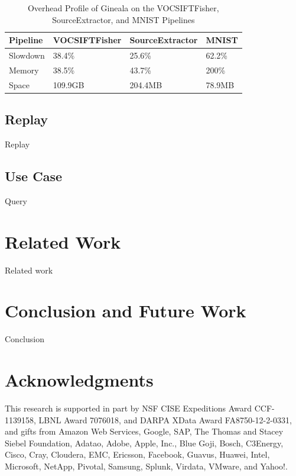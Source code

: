 \documentclass{sig-alternate}
\begin{document}
\begin{table}[ht]
\begin{center}
    \caption{Overhead Profile of Gineala on the VOCSIFTFisher, SourceExtractor, and MNIST Pipelines}
    \begin{scriptsize}
    \begin{tabular}{ | p{1.5cm} | p{2cm} | p{2cm} | p{1.5cm} | }
    \hline
    Pipeline & VOCSIFTFisher & SourceExtractor & MNIST  \\ \hline \hline
    Slowdown & 38.4\% & 25.6\% & 62.2\%   \\ \hline
    Memory & 38.5\% & 43.7\% & 200\%\\ \hline
    Space & 109.9GB & 204.4MB & 78.9MB \\ \hline
    \end{tabular}
    \end{scriptsize}
    \label{tb:apps-overhead}
\end{center}   
\end{table}

\subsection{Replay}
Replay

\subsection{Use Case}
Query

\section{Related Work}
\label{sec:Related}
Related work

\section{Conclusion and Future Work}
\label{sec:Conclusion}
Conclusion

\section{Acknowledgments}
This research is supported in part by NSF CISE Expeditions Award CCF-1139158, LBNL Award 7076018, and DARPA XData Award FA8750-12-2-0331, and gifts from Amazon Web Services, Google, SAP,  The Thomas and Stacey Siebel Foundation, Adatao, Adobe, Apple, Inc., Blue Goji, Bosch, C3Energy, Cisco, Cray, Cloudera, EMC, Ericsson, Facebook, Guavus, Huawei, Intel, Microsoft, NetApp, Pivotal, Samsung, Splunk, Virdata, VMware, and Yahoo!. 

%

%
%



\balancecolumns

\end{document}
